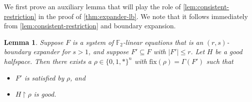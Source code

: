 \documentclass[11pt]{article}
\numberwithin{equation}{section}
\newtheorem{lemma}[theorem]{Lemma}
\theoremstyle{definition}
\theoremstyle{plain}
\newcommand{\set}[1]{\{ #1 \}}
\renewcommand{\restriction}{\!\!\upharpoonright}
\newcommand{\fix}{\ensuremath{\mathrm{fix}}}
\renewcommand{\restriction}{\!\ensuremath{\upharpoonright}\!}
\begin{document}
We first prove an auxiliary lemma that will play the role of \autoref{lem:consistent-restriction} in the proof of \autoref{thm:expander-lb}.
We note that it follows immediately from \autoref{lem:consistent-restriction} and boundary expansion.
\begin{lemma}\label{lem:boundary-cleanup}
	Suppose $F$ is a system of $\mathbb{F}_2$-linear equations that is an $(r, s)$-boundary expander for $s > 1$, and suppose $F' \subseteq F$ with $|F'| \leq r$.
	Let $H$ be a good halfspace.
	Then there exists a $\rho \in \set{0,1,*}^n$ with $\fix(\rho) = \Gamma(F')$ such that 
	\begin{itemize}
		\item $F'$ is satisfied by $\rho$, and
		\item $H \restriction \rho$ is good.
	\end{itemize}
\end{lemma}
\end{document}
